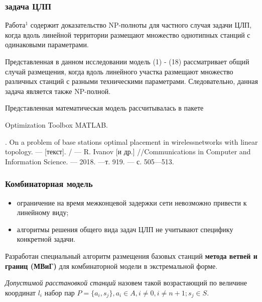 \begin{frame}
    \frametitle{задача ЦЛП}
    \justifying
    
    Работа$^1$ содержит доказательство NP-полноты для частного случая задачи ЦЛП, когда вдоль линейной территории размещают множество однотипных станций с одинаковыми параметрами. 
    \bigskip
    
    Представленная в данном исследовании модель (1) - (18) рассматривает общий случай размещения, когда вдоль линейного участка размещают множество различных станций с разными техническими параметрами. Следовательно, данная задача является также NP-полной.
    \bigskip

    Представленная математическая модель рассчитывалась в пакете
    
    Optimization Toolbox MATLAB.
    \bigskip

    \bigskip
    \bigskip
    \begin{minipage}[b]{0.99\linewidth}
        \fontsize{6pt}{7.2}. On a problem of base stations optimal placement in wirelessnetworks with linear topology. — [текст]. / — R. Ivanov [и др.] //Communications in Computer and Information Science. — 2018. —т. 919. — с. 505—513.
    \end{minipage}

\end{frame}

\begin{frame}
    \frametitle{Комбинаторная модель}
    \justifying

    \begin{itemize}
        \item ограничение на время межконцевой задержки сети невозможно привести к линейному виду;
        \item алгоритмы решения общего вида задач ЦЛП не учитывают специфику конкретной задачи.
    \end{itemize}
    

    \bigskip
    Разработан специальный алгоритм размещения базовых станций \textbf{метода ветвей и границ (МВиГ)} для комбинаторной модели в экстремальной форме.

    \bigskip
    \textit{Допустимой расстановкой станций} назовем такой возрастающий по величине координат $l_i$  набор пар $P = \{a_i, s_j\},a_i \in A,i \neq 0,i \neq n+1;s_j \in S$.

\end{frame}

